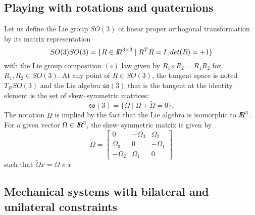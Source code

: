 \subsection{Playing with rotations and quaternions}

Let us define the Lie group $SO(3)$ of linear proper orthogonal transformation by its matrix representation
\begin{equation}SO(3)
  \label{eq:43}
  SO(3) = \{R \in \mbox{\rm $I\!\!R$}^{3\times3}\mid R^TR=I , det(R) = +1  \}
\end{equation}
with the Lie group composition $( \circ )$ law given by $R_1\circ R_2 = R_1R_2$ for $R_1,R_2\in SO(3)$. At any point of $R\in SO(3)$, the tangent space is noted $T_RSO(3)$ and the Lie algebra $\mathfrak{so}(3)$  that is the tangent at the identity element is the set of skew--symmetric matrices:
\begin{equation}
  \label{eq:44}
  \mathfrak{so}(3) = \{\Omega \mid \Omega + \tilde \Omega=0\}.
\end{equation}
The notation $\tilde \Omega$ is implied by the fact that the Lie algebra is isomorphic to $\mbox{\rm $I\!\!R$}^3$. For a given vector $\Omega \in \mbox{\rm $I\!\!R$}^3$, the skew--symmetric matrix is given by
\begin{equation}
  \label{eq:45}
  \tilde \Omega =
  \begin{bmatrix}
    0 & -\Omega_3 & \Omega_2 \\
    \Omega_3 & 0 & -\Omega_1 \\
    -\Omega_2  & \Omega_1 & 0
  \end{bmatrix}
\end{equation}
such that $\tilde \Omega x = \Omega \times x$


\subsection{Mechanical systems  with bilateral and unilateral constraints}
\label{section22}




